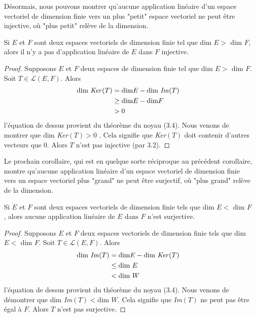 \documentclass[12pt]{book}
\begin{document}
Désormais, nous pouvons montrer qu'aucune application linéaire d'un espace vectoriel de dimension finie vers un plus "petit" espace vectoriel ne peut être injective, où "plus petit" relève de la dimension.

\begin{coro}
Si $E$ et $F$ sont deux espaces vectoriels de dimension finie tel que dim $E >$ dim $F$, alors il n'y a pas d'application linéaire de $E$ dans $F$ injective.
\begin{proof}
Supposons $E$ et $F$ deux espaces de dimension finie tel que dim $E >$ dim $F$. Soit $T\in \mathcal{L}(E,F)$. Alors 
\begin{equation*}
\begin{split}
\textrm{dim \textit{Ker}}(T) & =\textrm{dim} E-\textrm{dim \textit{Im}}(T) \\
& \geq \textrm{dim} E - \textrm{dim} F\\
& > 0
\end{split}﻿
\end{equation*}
l'équation de dessus provient du théorème du noyau (3.4). Nous venons de montrer que dim \textit{Ker}$(T) > 0$ . Cela signifie que \textit{Ker}$(T)$ doit contenir d'autres vecteurs que 0. Alors $T$ n'est pas injective (par 3.2).
\end{proof}
\end{coro}

Le prochain corollaire, qui est en quelque sorte réciproque au précédent corollaire, montre qu'aucune application linéaire d'un espace vectoriel de dimension finie vers un espace vectoriel plus "grand" ne peut être surjectif, où "plus grand" relève de la dimension.

\begin{coro}
Si $E$ et $F$ sont deux espaces vectoriels de dimension finie tels que dim $E <$ dim $F$, alors aucune application linéaire de $E$ dans $F$ n'est surjective.
\begin{proof}
Supposons $E$ et $F$ deux espaces vectoriels de dimension finie tels que dim $E <$ dim $F$. Soit $T\in \mathcal{L}(E,F)$. Alors
\begin{equation*}
    \begin{split}
        \textrm{dim \textit{Im}}(T) & = \textrm{dim} E - \textrm{dim \textit{Ker}}(T) \\
        & \leq \textrm{dim } E \\
        & < \textrm{dim } W
    \end{split}
\end{equation*}
l'équation de dessus provient du théorème du noyau (3.4). Nous venons de démontrer que dim \textit{Im}$(T) < \textrm{dim } W$. Cela signifie que \textit{Im}$(T)$ ne peut pas être égal à $F$. Alors $T$ n'est pas surjective.
\end{proof}
\end{coro}
\end{document}
